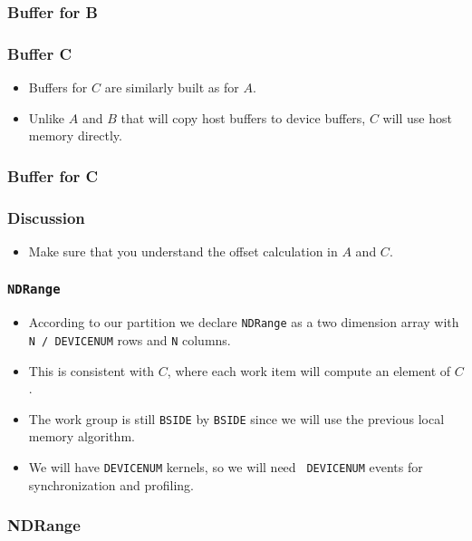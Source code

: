 \documentclass{beamer}
\begin{document}
\begin{frame}
  \frametitle{Buffer for B}
\end{frame}

\begin{frame}
  \frametitle{Buffer C}
  \begin{itemize}
    \item Buffers for $C$ are similarly built as for $A$.
    \item Unlike $A$ and $B$ that will copy host buffers to device
      buffers, $C$ will use host memory directly.
  \end{itemize}
\end{frame}

\begin{frame}
  \frametitle{Buffer for C}
\end{frame}

\begin{frame}
  \frametitle{Discussion}
  \begin{itemize}
    \item Make sure that you understand the offset calculation in $A$
      and $C$.
  \end{itemize}
\end{frame}

\begin{frame}
  \frametitle{\tt NDRange}
  \begin{itemize}
    \item According to our partition we declare {\tt NDRange} as a two
      dimension array with {\tt N / DEVICENUM} rows and {\tt N} columns.
    \item This is consistent with $C$, where each work item will
      compute an element of $C$.
    \item The work group is still {\tt BSIDE} by {\tt BSIDE} since we
      will use the previous local memory algorithm.
    \item We will have {\tt DEVICENUM} kernels, so we will need {\tt
      DEVICENUM} events for synchronization and profiling.
  \end{itemize}
\end{frame}

\begin{frame}
  \frametitle{NDRange}
\end{frame}
\end{document}
